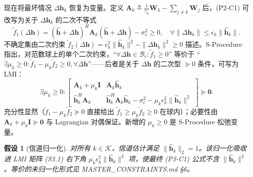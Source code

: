 \documentclass[12pt,a4paper]{article}
\newtheorem{assumption}{假设}
\newcommand{\vect}[1]{\mathbf{#1}}
\newcommand{\mat}[1]{\mathbf{#1}}
\begin{document}
现在将最坏情况 $\Delta\vect{h}_k$ 恢复为变量。定义 $\mat{A}_k \triangleq \frac{1}{\gamma_k} \mat{W}_k - \sum_{j\neq k} \mat{W}_j$ 后，(P2-C1) 可改写为关于 $\Delta\vect{h}_k$ 的二次不等式
$$
\tilde{f}_1(\Delta\vect{h}) = (\hat{\vect{h}} + \Delta\vect{h})^H \mat{A}_k (\hat{\vect{h}} + \Delta\vect{h}) - \sigma_c^2 \geq 0, \quad \forall \|\Delta\vect{h}_k\| \leq \epsilon_h \|\hat{\vect{h}}_k\|.
$$
不确定集由二次约束 $\tilde{f}_2(\Delta\vect{h}) = \epsilon_h^2 \|\hat{\vect{h}}_k\|^2 - \|\Delta\vect{h}_k\|^2 \geq 0$ 描述。S-Procedure 指出，对范数球上的单个二次约束，``$\forall \Delta\vect{h} \in \mathcal{B}_\epsilon: \tilde{f}_1 \geq 0$'' 等价于 ``$\exists \mu_k \geq 0: \tilde{f}_1 - \mu_k \tilde{f}_2 \geq 0, \forall \Delta\vect{h}$''——后者是关于 $\Delta\vect{h}$ 的二次型 $\succeq 0$ 条件，可写为 LMI：
\begin{equation}
\exists \mu_k \geq 0: \begin{bmatrix} \mat{A}_k + \mu_k \mat{I} & \mat{A}_k \hat{\vect{h}}_k \\[1.2ex] \hat{\vect{h}}_k^H \mat{A}_k & \hat{\vect{h}}_k^H \mat{A}_k \hat{\vect{h}}_k - \sigma_c^2 - \mu_k \epsilon_h^2 \|\hat{\vect{h}}_k\|^2 \end{bmatrix} \succeq \mat{0}. \tag{S3.1}
\end{equation}
充分性显然（$\tilde{f}_1 - \mu_k \tilde{f}_2 \succeq 0$ 直接给出 $\tilde{f}_1 \geq \mu_k \tilde{f}_2 \geq 0$ 在球内）；必要性由 $\mat{A}_k + \mu_k \mat{I} \succeq \mat{0}$ 与 Lagrangian 对偶保证。新增的 $\mu_k \geq 0$ 是 S-Procedure 松弛变量。

\begin{assumption}[信道归一化]\label{ass:channel_norm}
对所有 $k \in \mathcal{K}$，信道估计满足 $\|\hat{\vect{h}}_k\|_2 = 1$。该归一化吸收进 LMI 矩阵 (S3.1) 右下角 $\mu_k \epsilon_h^2 \|\hat{\vect{h}}_k\|^2$ 项，使最终 (P3-C1) 公式不含 $\|\hat{\vect{h}}_k\|^2$。等价的未归一化形式见 MASTER\_CONSTRAINTS.md §6。
\end{assumption}
\end{document}
